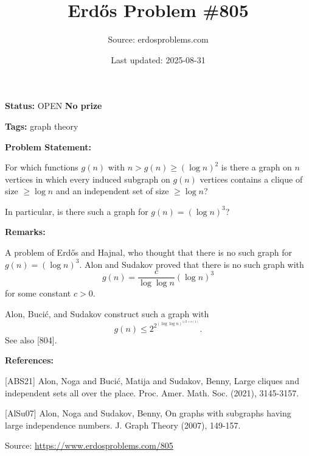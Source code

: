 \documentclass{article}
\title{Erd\H{o}s Problem \#805}
\date{Last updated: 2025-08-31}
\author{Source: erdosproblems.com}
\begin{document}
\maketitle

\noindent\textbf{Status:} OPEN \quad \textbf{No prize}

\noindent\textbf{Tags:} graph theory

\medskip
\noindent\textbf{Problem Statement:}

For which functions $g(n)$ with $n>g(n)\geq (\log n)^2$ is there a graph on $n$ vertices in which every induced subgraph on $g(n)$ vertices contains a clique of size $\geq \log n$ and an independent set of size $\geq \log n$?

In particular, is there such a graph for $g(n)=(\log n)^3$?

\bigskip
\noindent\textbf{Remarks:}

A problem of Erd\H{o}s and Hajnal, who thought that there is no such graph for $g(n)=(\log n)^3$. Alon and Sudakov \cite{AlSu07} proved that there is no such graph with\[g(n)=\frac{c}{\log\log n}(\log n)^3\]for some constant $c>0$.

Alon, Buci\'{c}, and Sudakov \cite{ABS21} construct such a graph with\[g(n)\leq 2^{2^{(\log\log n)^{1/2+o(1)}}}.\]See also [804].

\bigskip
\noindent\textbf{References:}

[ABS21] Alon, Noga and Buci\'c, Matija and Sudakov, Benny, Large cliques and independent sets all over the place. Proc. Amer. Math. Soc. (2021), 3145-3157.
 
 [AlSu07] Alon, Noga and Sudakov, Benny, On graphs with subgraphs having large independence numbers. J. Graph Theory (2007), 149-157.

\bigskip
\noindent\small{Source: \url{https://www.erdosproblems.com/805}}
\end{document}
